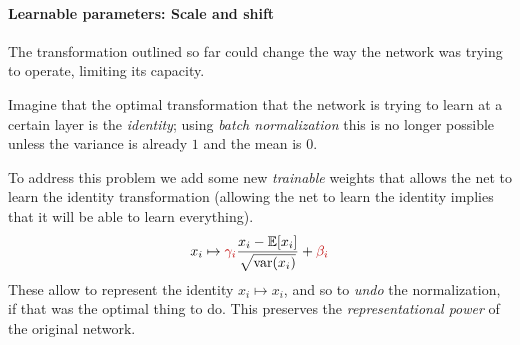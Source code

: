 

\paragraph{Learnable parameters: Scale and shift}

The transformation outlined so far could change the way the network was trying to operate,
limiting its capacity. 

Imagine that the optimal transformation that the network is trying to learn at a certain layer is the \emph{identity}; using \emph{batch normalization} this is no longer possible unless the variance is already $1$ and the mean is $0$.

To address this problem we add some new \emph{trainable} weights that allows the net to learn the identity transformation (allowing the net to learn the identity implies that it will be able to learn everything).
\begin{equation}
    x_i \mapsto {\color{darkred}\gamma_i} \frac{ x_i - \mathbb{E}[x_i]}{\sqrt{\mathrm{var}(x_i)}} + {\color{darkred}\beta_i}
\end{equation}
These allow to represent the identity $x_i \mapsto x_i$, and so to \emph{undo} the normalization,
if that was the optimal thing to do. This preserves the \emph{representational power} of the 
original network.

